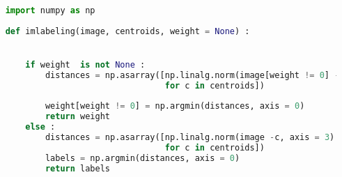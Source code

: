 	\lstset{style=python}
	\begin{lstlisting}[language=python, caption=imlabeling, label=code:imlabeling]
		
	import numpy as np
	
	def imlabeling(image, centroids, weight = None) :


		if weight  is not None :
			distances = np.asarray([np.linalg.norm(image[weight != 0] -c, axis = 1) 
									for c in centroids])
		
			weight[weight != 0] = np.argmin(distances, axis = 0)
			return weight
		else :
			distances = np.asarray([np.linalg.norm(image -c, axis = 3) 
									for c in centroids])
			labels = np.argmin(distances, axis = 0)
			return labels
	
	
	\end{lstlisting}
	



	
	
